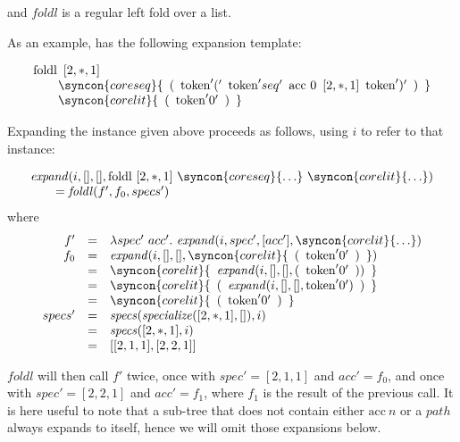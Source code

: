 \documentclass{kththesis}
\begin{document}
and $\mathit{foldl}$ is a regular left fold over a list.

As an example,  has the following expansion template:

$$
\begin{array}{l}
\text{foldl} \enspace [2, *, 1] \\
\qquad \syncon{coreseq}\{ \enspace \text{(} \enspace \text{token}'(' \enspace \text{token}'seq' \enspace \text{acc}~0 \enspace [2, *, 1] \enspace \text{token}')' \enspace \text{)} \enspace \} \\
\qquad \syncon{corelit}\{ \enspace \text{(} \enspace \text{token}'0' \enspace \text{)} \enspace \} \\
\end{array}
$$

Expanding the instance given above proceeds as follows, using $i$ to refer to that instance:

$$
\begin{array}{l}
\expand(i, [], [], \text{foldl}~[2, *, 1]~\syncon{coreseq}\{\ldots\}~\syncon{corelit}\{\ldots\}) \\
\qquad = \mathit{foldl}(f', f_0, specs') \\
\end{array}
$$
where
$$
\begin{array}{rcl}
f' & = & \lambda spec'~acc'.~ \expand(i, spec', [acc'], \syncon{corelit}\{\ldots\}) \\
f_0 & = & \expand(i, [], [], \syncon{corelit}\{ \enspace \text{(} \enspace \text{token}'0' \enspace \text{)} \enspace \})\\
& = & \syncon{corelit}\{ \enspace \expand(i, [], [], \text{(} \enspace \text{token}'0' \enspace \text{)}) \enspace \} \\
& = & \syncon{corelit}\{ \enspace \text{(} \enspace \expand(i, [], [], \text{token}'0') \enspace \text{)} \enspace \} \\
& = & \syncon{corelit}\{ \enspace \text{(} \enspace \text{token}'0' \enspace \text{)} \enspace \} \\
specs' & = & \specs(\specialize([2, *, 1], []), i) \\
& = & \specs([2, *, 1], i) \\
& = & [[2, 1, 1], [2, 2, 1]] \\
\end{array}
$$

$\mathit{foldl}$ will then call $f'$ twice, once with $spec' = [2, 1, 1]$ and $acc' = f_0$, and once with $spec' = [2, 2, 1]$ and $acc' = f_1$, where $f_1$ is the result of the previous call. It is here useful to note that a sub-tree that does not contain either $\text{acc}~n$ or a $path$ always expands to itself, hence we will omit those expansions below.
\end{document}

